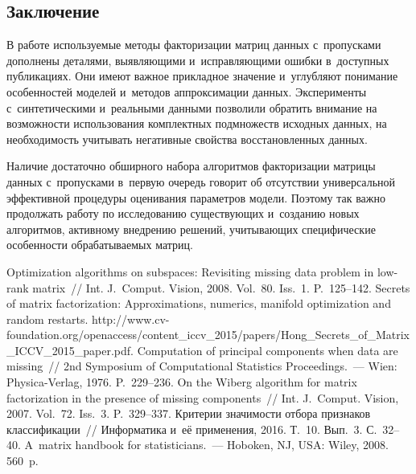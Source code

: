 \begin{multicols}{2}
\vspace*{-6pt}

\section{Заключение}

\vspace*{-2pt}

     В работе используемые методы факторизации матриц данных 
с~пропусками дополнены деталями, выявляющими и~исправляющими ошибки 
в~доступных публикациях. Они имеют важное прикладное значение 
и~углубляют понимание особенностей моделей и~методов аппроксимации 
данных. Эксперименты с~синтетическими и~реальными данными позволили 
обратить внимание на возможности использования комплектных подмножеств 
исходных данных, на необходимость учитывать негативные свойства 
восстановленных данных.
     
     Наличие достаточно обширного набора алгоритмов факторизации 
матрицы данных с~пропусками в~первую очередь говорит об отсутствии 
универсальной эффективной процедуры оценивания параметров модели. 
Поэтому так важно продолжать работу по исследованию существующих 
и~созданию новых алгоритмов, активному внедрению решений, учитывающих 
специфические особенности обрабатываемых матриц. 

\vspace*{-6pt}

{\small\frenchspacing
 {\baselineskip=12pt
 \begin{thebibliography}{9}
 
 \vspace*{-2pt}
 
 Optimization algorithms on subspaces: Revisiting missing data 
problem in low-rank matrix~// Int. J.~Comput. Vision, 2008. Vol.~80. Iss.~1. 
P.~125--142.
 Secrets of matrix factorization: Approximations, 
numerics, manifold optimization and random restarts. {\sf  
http://www.cv-foundation.org/openaccess/\linebreak content\_iccv\_2015/papers/Hong\_Secrets\_of\_Matrix\_\linebreak ICCV\_2015\_paper.pdf}.
 Computation of principal components when data are missing~// 2nd 
Symposium of Computational Statistics Proceedings.~--- Wien: Physica-Verlag, 
1976. P.~229--236.
 On the Wiberg algorithm for matrix factorization in the 
presence of missing components~// Int. J.~Comput. Vision, 2007. Vol.~72. Iss.~3. 
P.~329--337.
 Критерии значимости отбора признаков 
классификации~// Информатика и~её применения, 2016. Т.~10. Вып.~3.  
С.~32--40.
 A~matrix handbook for statisticians.~--- Hoboken, NJ, USA: 
Wiley, 2008. 560~p.
\end{thebibliography}

 }
 }

\end{multicols}

